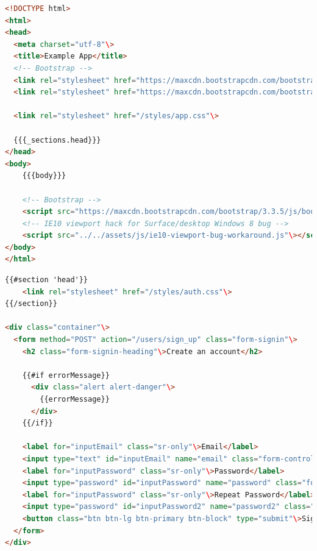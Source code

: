 \begin{lstlisting}[caption={Layout używany w aplikacji napisanej przy pomocy Express'a.},label={lst:express_layout},language=HTML]
<!DOCTYPE html>
<html>
<head>
  <meta charset="utf-8"\>
  <title>Example App</title>
  <!-- Bootstrap -->
  <link rel="stylesheet" href="https://maxcdn.bootstrapcdn.com/bootstrap/3.3.5/css/bootstrap.min.css"\>
  <link rel="stylesheet" href="https://maxcdn.bootstrapcdn.com/bootstrap/3.3.5/css/bootstrap-theme.min.css"\>

  <link rel="stylesheet" href="/styles/app.css"\>

  {{{_sections.head}}}
</head>
<body>
    {{{body}}}

    <!-- Bootstrap -->
    <script src="https://maxcdn.bootstrapcdn.com/bootstrap/3.3.5/js/bootstrap.min.js"\></script>
    <!-- IE10 viewport hack for Surface/desktop Windows 8 bug -->
    <script src="../../assets/js/ie10-viewport-bug-workaround.js"\></script>
</body>
</html>
\end{lstlisting}

\newpage
\begin{lstlisting}[caption={Podstrona rejestracji użytkownika w Express'ie.},label={lst:express_view},language=HTML]
{{#section 'head'}}
    <link rel="stylesheet" href="/styles/auth.css"\>
{{/section}}

<div class="container"\>
  <form method="POST" action="/users/sign_up" class="form-signin"\>
    <h2 class="form-signin-heading"\>Create an account</h2>

    {{#if errorMessage}}
      <div class="alert alert-danger"\>
        {{errorMessage}}
      </div>
    {{/if}}

    <label for="inputEmail" class="sr-only"\>Email</label>
    <input type="text" id="inputEmail" name="email" class="form-control" placeholder="Email" required autofocus>
    <label for="inputPassword" class="sr-only"\>Password</label>
    <input type="password" id="inputPassword" name="password" class="form-control" placeholder="Password" required>
    <label for="inputPassword" class="sr-only"\>Repeat Password</label>
    <input type="password" id="inputPassword2" name="password2" class="form-control" placeholder="Repeat Password" required>
    <button class="btn btn-lg btn-primary btn-block" type="submit"\>Sign up</button>
  </form>
</div>
\end{lstlisting}
